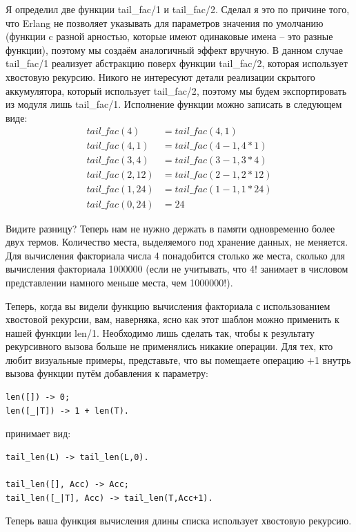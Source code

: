 \documentclass[a4paper,12pt]{report}
\newcommand{\ops}{\colorbox{lgreen}}
\begin{document}
Я определил две функции \ops{tail\_fac/1} и \ops{tail\_fac/2}. Сделал я это по причине того, что Erlang не позволяет указывать для параметров значения по умолчанию (функции c разной арностью, которые имеют одинаковые имена \--- это разные функции), поэтому мы создаём аналогичный эффект вручную. В данном случае \ops{tail\_fac/1} реализует абстракцию поверх функции \ops{tail\_fac/2}, которая использует хвостовую рекурсию. Никого не интересуют детали реализации скрытого аккумулятора, который использует \ops{tail\_fac/2}, поэтому мы будем экспортировать из модуля лишь \ops{tail\_fac/1}. Исполнение функции можно записать в следующем виде:
\begin{align*}
tail\_fac(4) &= tail\_fac(4,1)\\
tail\_fac(4,1) &= tail\_fac(4-1, 4*1)\\
tail\_fac(3,4) &= tail\_fac(3-1, 3*4)\\
tail\_fac(2,12) &= tail\_fac(2-1,2*12)\\
tail\_fac(1,24) &= tail\_fac(1-1, 1*24)\\
tail\_fac(0,24) &= 24
\end{align*}

Видите разницу? Теперь нам не нужно держать в памяти одновременно более двух термов. Количество места, выделяемого под хранение данных, не меняется. Для вычисления факториала числа 4 понадобится столько же места, сколько для вычисления факториала 1000000 (если не учитывать, что 4! занимает в числовом представлении намного меньше места, чем 1000000!).

Теперь, когда вы видели функцию вычисления факториала с использованием хвостовой рекурсии, вам, наверняка, ясно как этот шаблон можно применить к нашей функции \ops{len/1}. Необходимо лишь сделать так, чтобы к результату рекурсивного вызова больше не применялись никакие операции. Для тех, кто любит визуальные примеры, представьте, что вы помещаете операцию \ops{+1} внутрь вызова функции путём добавления к параметру:
\begin{lstlisting}[style=erlang]
len([]) -> 0;
len([_|T]) -> 1 + len(T).
\end{lstlisting}
принимает вид:
\begin{lstlisting}[style=erlang]
tail_len(L) -> tail_len(L,0).
 
tail_len([], Acc) -> Acc;
tail_len([_|T], Acc) -> tail_len(T,Acc+1).
\end{lstlisting}

Теперь ваша функция вычисления длины списка использует хвостовую рекурсию.
\end{document}
